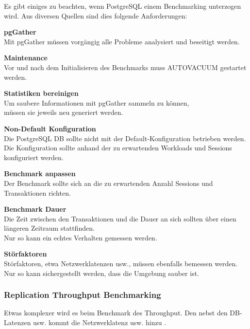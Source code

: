 \begin{flushleft}
    Es gibt einiges zu beachten, wenn PostgreSQL einem Benchmarking unterzogen wird.
    Aus diversen Quellen \cite{768DXXJK, 67TNVGTX, T3VEV98H, VXNYQFTE} sind dies folgende Anforderungen:
     \begin{description}
        \item \textbf{pgGather}\hfill \\Mit pgGather \cite{FGL8E2X5} müssen vorgängig alle Probleme analysiert und beseitigt werden.
        \item \textbf{Maintenance}\hfill \\Vor und nach dem Initialisieren des Benchmarks muss \Gls{AUTOVACUUM} gestartet werden.
        \item \textbf{Statistiken bereinigen}\hfill \\Um saubere Informationen mit pgGather sammeln zu können,\\müssen sie jeweils neu generiert werden.
        \item \textbf{Non-Default Konfiguration}\hfill \\Die PostgreSQL DB sollte nicht mit der Default-Konfiguration betrieben werden.\\Die Konfiguration sollte anhand der zu erwartenden Workloads und Sessions konfiguriert werden.
        \item \textbf{Benchmark anpassen}\hfill \\Der Benchmark sollte sich an die zu erwartenden Anzahl Sessions und \Gls{Transaktion}en richten.
        \item \textbf{Benchmark Dauer}\hfill \\Die Zeit zwischen den \Gls{Transaktion}en und die Dauer an sich sollten über einen längeren Zeitraum stattfinden.\\Nur so kann ein echtes Verhalten gemessen werden.
        \item \textbf{Störfaktoren}\hfill \\Störfaktoren, etwa Netzwerklatenzen \cite{5VBTYNB7} usw.,
        müssen ebenfalls bemessen werden.\\Nur so kann sichergestellt werden, dass die Umgebung sauber ist.
    \end{description}
\end{flushleft}
\begin{flushleft}
    \subsubsection{Replication Throughput Benchmarking}
    Etwas komplexer wird es beim Benchmark des Throughput.
    Den nebst den DB-Latenzen usw. kommt die Netzwerklatenz usw. hinzu \cite{UU5X5NID}.
\end{flushleft}
